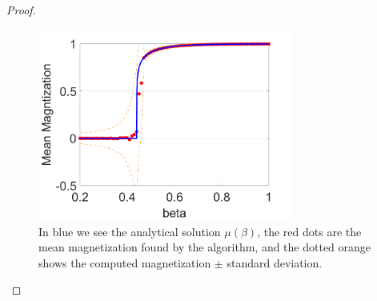 \documentclass[12pt]{report}
\newenvironment{problem}{}{\newpage}
\begin{document}
\begin{problem}
\begin{proof}
\begin{enumerate}
    \begin{figure}[H]
        \centering
        \includegraphics[width=0.75\textwidth,height=\textwidth,keepaspectratio]{images/coolplot3.png}
        \caption{In blue we see the analytical solution $\mu(\beta)$, the red dots are the mean magnetization found by the algorithm, and the dotted orange shows the computed magnetization $\pm$ standard deviation.}
        \label{fig3}
    \end{figure}

    
\end{enumerate}

\end{proof}
\end{problem}
\end{document}
